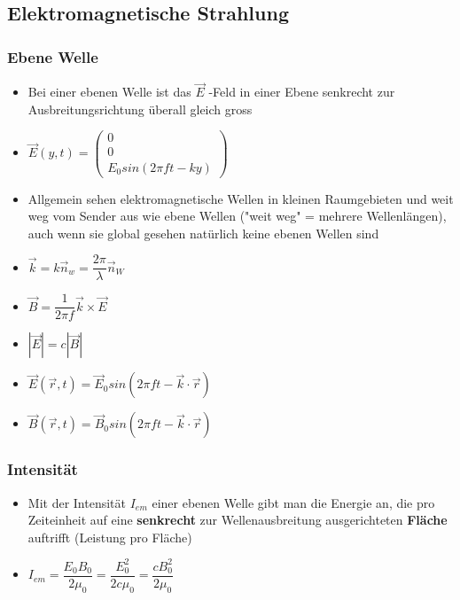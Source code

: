 \documentclass[8pt,a4paper]{scrartcl}
\begin{document}
\begin{multicols*}{3}
					
				\subsection{Elektromagnetische Strahlung}		
					\subsubsection{Ebene Welle}
						\begin{itemize}\itemsep0pt
							\item Bei einer ebenen Welle ist
das $\overrightarrow{E}$ -Feld in einer Ebene senkrecht zur Ausbreitungsrichtung überall gleich gross
							\item $\overrightarrow{E}(y,t) = \begin{pmatrix}0\\0\\E_{0}sin(2\pi ft-ky)\end{pmatrix}$
							\item Allgemein sehen elektromagnetische Wellen in kleinen Raumgebieten und weit weg vom Sender aus wie ebene Wellen ("weit weg" = mehrere Wellenlängen), auch wenn sie global gesehen natürlich keine ebenen Wellen sind
							\item $\overrightarrow{k}=k\overrightarrow{n}_{w}=\dfrac{2\pi}{\lambda}\overrightarrow{n}_{W}$
							\item $\overrightarrow{B}=\dfrac{1}{2\pi f}\overrightarrow{k}\times \overrightarrow{E}$
							\item $|\overrightarrow{E}| = c|\overrightarrow{B}|$
							\item $\overrightarrow{E}(\overrightarrow{r},t) = \overrightarrow{E}_{0}sin(2\pi ft-\overrightarrow{k}\cdot \overrightarrow{r})$
							\item $\overrightarrow{B}(\overrightarrow{r},t) = \overrightarrow{B}_{0}sin(2\pi ft-\overrightarrow{k}\cdot \overrightarrow{r})$
							
						\end{itemize}	
					\subsubsection{Intensität}
						\begin{itemize}\itemsep0pt
							\item Mit der Intensität $I_{em}$ einer ebenen Welle gibt man die Energie an, die pro Zeiteinheit auf eine \textbf{senkrecht} zur Wellenausbreitung ausgerichteten \textbf{Fläche} auftrifft (Leistung pro Fläche)
							\item $I_{em}=\dfrac{E_{0}B_{0}}{2\mu_{0}}=\dfrac{E_{0}^{2}}{2c\mu_{0}} = \dfrac{cB_{0}^{2}}{2\mu_{0}}$
						\end{itemize}
						

\end{multicols*}
\end{document}

